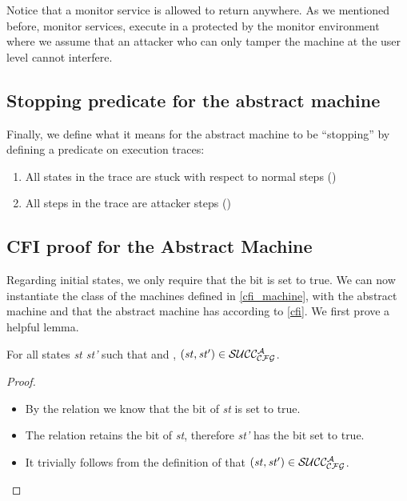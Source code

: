 Notice that a monitor service is allowed to return anywhere. As we
mentioned before, monitor services, execute in a protected by the
monitor environment where we assume that an attacker who can only
tamper the machine at the user level cannot interfere.

\subsection{Stopping predicate for the abstract machine}
\label{sec:abstract_stopping}

Finally, we define what it means for the abstract machine to be ``stopping'' by
defining a predicate on execution traces:
\begin{enumerate}
\item All states in the trace are stuck with respect to normal steps
  (\stepn{}{})
\item All steps in the trace are attacker steps (\stepa{}{}{})
\end{enumerate}

\subsection{CFI proof for the Abstract Machine}\label{abstract_proof}

Regarding initial states, we only require that the \ok bit is set to true.
We can now instantiate the class of the machines defined in 
\cref{cfi_machine}, with the abstract machine and that the abstract machine
has \CFI according to \cref{cfi}.
We first prove a helpful lemma.

\begin{lemma}
\label{attacker_no_v}
For all states \textit{st st'} such that 
and , $(\mathit{st},\mathit{st'}) \in \mathcal{SUCC_\mathcal{CFG}^{A}}$.
\end{lemma}

\begin{proof}
~
\begin{itemize}
\item By the relation  we know that the \ok bit
of \textit{st} is set to true. 
\item The relation  retains the \ok bit of
\textit{st}, therefore \textit{st'} has the \ok bit set to true.
\item It trivially follows from the definition of  that
$(\mathit{st},\mathit{st'}) \in \mathcal{SUCC_\mathcal{CFG}^{A}}$.
\end{itemize}
\end{proof}

